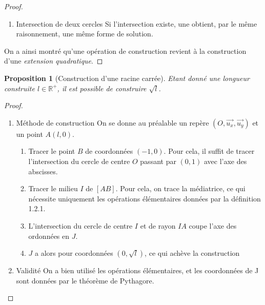 \documentclass[a4paper,12pt,french]{report}
\newtheorem{proposition}{Proposition}[section]
\begin{document}
\begin{proof}
\begin{enumerate}
\[\begin{array}{lllll}
								a = \frac{y_A-y_B}{x_A-x_B}\\
								b = x_A\left(y_B - y_A + \frac{y_B-y_A}{x_A-x_B}\right)+y_A \\
								r = \sqrt{(x_M - x_\Omega)^2 + (y_M - y_\Omega)^2} \\
								y = ax + b \\
								(a^2 + 1)x^2 + 2(a(b-y_B)-x_\Omega)x + {x_\Omega}^2 + (b-y_\Omega)^2 - r^2 = 0
							\end{array}
							\right.
							\]
						Ce qui achève la preuve. D'autre part, s'il existe une solution, elle sera bien, pour chaque coordonnée de l'intersection, de la forme \(k + l \sqrt{\delta_0}\), avec \(k, l, \delta_0 \in \mathbb{K}\).
						\item{Intersection de deux cercles} Si l'intersection existe, une obtient, par le même raisonnement, une même forme de solution.
					\end{enumerate}
					On a ainsi montré qu'une opération de construction revient à la construction d'une \emph{extension quadratique}.
				\end{proof}
		
		\begin{proposition}[Construction d'une racine carrée]
			Etant donné une longueur construite \(l \in \mathbb{R}^+\), il est possible de construire \(\sqrt{l}\).{}
		\end{proposition}
			\begin{proof}
				\begin{enumerate}
					\item{Méthode de construction}
					On se donne au préalable un repère \( (O, \vec{u_x}, \vec{u_y}) \) et un point \(A(l, 0)\). 
						\begin{enumerate}
							\item Tracer le point \(B\) de coordonnées \((-1, 0)\). Pour cela, il suffit de tracer l'intersection du cercle de centre \(O\) passant par \((0, 1)\) avec l'axe des abscisses.
							\item Tracer le milieu \(I\) de \([AB]\). Pour cela, on trace la médiatrice, ce qui nécessite uniquement les opérations élémentaires données par la définition 1.2.1.
							\item L'intersection du cercle de centre \(I\) et de rayon \(IA\) coupe l'axe des ordonnées en \(J\).
							\item \( J \) a alors pour coordonnées \((0, \sqrt{l})\), ce qui achève la construction
						\end{enumerate}
					\item{Validité} On a bien utilisé les opérations élémentaires, et les coordonnées de J sont données par le théorème de Pythagore.
				\end{enumerate}
			\end{proof}
			
\end{document}
